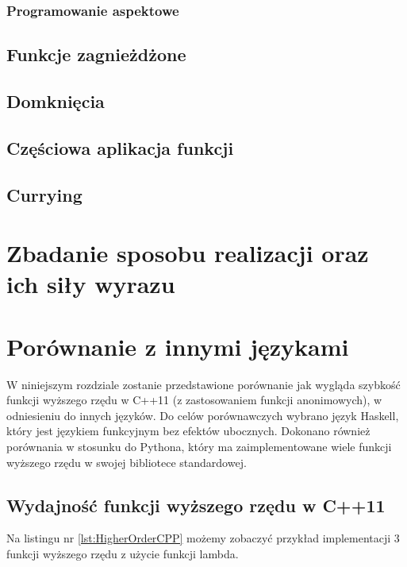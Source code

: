\documentclass{pracamgr}
\begin{document}
\subsection{Programowanie aspektowe}

\section{Funkcje zagnieżdżone}
\section{Domknięcia}
\section{Częściowa aplikacja funkcji}
\section{Currying}



\chapter{Zbadanie sposobu realizacji oraz ich siły wyrazu}\label{r:SposobRealizacji}
 








\chapter{Porównanie z innymi językami}\label{r:Porownanie}

W niniejszym rozdziale zostanie przedstawione porównanie jak wygląda szybkość funkcji 
wyższego rzędu w C++11 (z zastosowaniem funkcji anonimowych), w odniesieniu do innych języków.
Do celów porównawczych wybrano język Haskell, który jest językiem funkcyjnym bez efektów ubocznych.
Dokonano również porównania w stosunku do Pythona, który ma zaimplementowane wiele 
funkcji wyższego rzędu w swojej bibliotece standardowej.

\section{Wydajność funkcji wyższego rzędu w C++11}


Na listingu nr \ref{lst:HigherOrderCPP} możemy zobaczyć przykład implementacji 3 funkcji wyższego rzędu 
z użycie funkcji lambda. 
\end{document}
